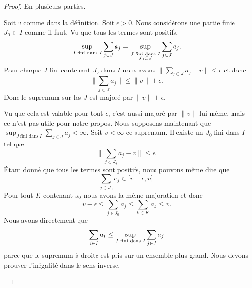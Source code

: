 \begin{proof}
    En plusieurs parties.
    \begin{subproof}
        Soit \( v\) comme dans la définition. Soit \( \epsilon>0\). Nous considérons une partie finie \( J_0\subset I\) comme il faut. Vu que tous les termes sont positifs,
        \begin{equation}
            \sup_{\text{\( J\) fini dans \( I\)}}\sum_{j\in J}a_j=\sup_{_{\substack{\text{\( J\) fini dans \( I\)}\\J_0\subset J}}}\sum_{j\in J}a_j.
        \end{equation}
        Pour chaque \( J\) fini contenant \( J_0\) dans \( I\) nous avons \( \| \sum_{j\in J}a_j-v \|\leq\epsilon\) et donc
        \begin{equation}
            \| \sum_{j\in J}a_j \|\leq \| v \|+\epsilon.
        \end{equation}
        Donc le supremum sur les \( J\) est majoré par \( \| v \|+\epsilon\).

        Vu que cela est valable pour tout \( \epsilon\), c'est aussi majoré par \( \| v \|\) lui-même, mais ce n'est pas utile pour notre propos.
        Nous supposons maintenant que $\sup_{ J\text{ fini dans } I}\sum_{j\in J}a_j<\infty$. Soit \( v<\infty\) ce supremum. Il existe un \( J_0\) fini dans \( I\) tel que
        \begin{equation}
            \| \sum_{j\in J_0}a_j-v \|\leq \epsilon.
        \end{equation}
        Étant donné que tous les termes sont positifs, nous pouvons même dire que 
        \begin{equation}
            \sum_{j\in J_0}a_j\in\mathopen[ v-\epsilon , v \mathclose].
        \end{equation}
        Pour tout \( K\) contenant \( J_0\) nous avons la même majoration et donc
        \begin{equation}
            v-\epsilon\leq \sum_{j\in J_0}a_j\leq \sum_{k\in K}a_k\leq v.
        \end{equation}
        Nous avons directement que
        \begin{equation}
            \sum_{i\in I}a_i\leq \sup_{\text{\( J\) fini dans \( I\)}}\sum_{j\in J}a_j
        \end{equation}
        parce que le supremum à droite est pris sur un ensemble plus grand. Nous devons prouver l'inégalité dans le sens inverse. 


\end{subproof}
\end{proof}
